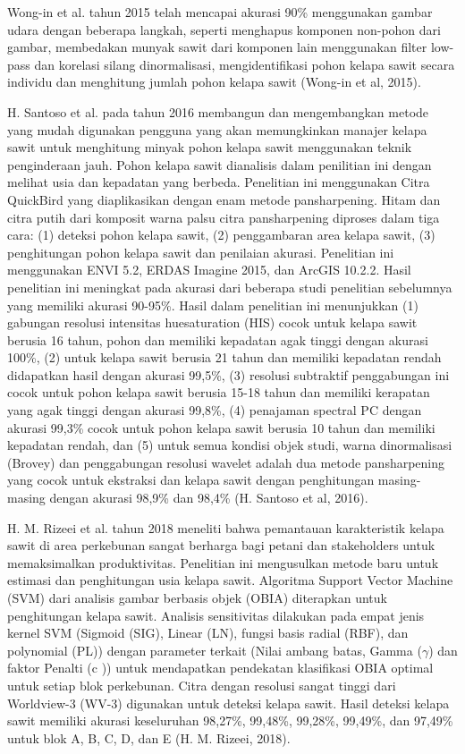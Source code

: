 Wong-in et al. tahun 2015 telah mencapai akurasi 90\% menggunakan gambar udara dengan beberapa langkah, seperti menghapus komponen non-pohon dari gambar, membedakan munyak sawit dari komponen lain menggunakan filter low-pass dan korelasi silang dinormalisasi, mengidentifikasi pohon kelapa sawit secara individu dan menghitung jumlah pohon kelapa sawit (Wong-in et al, 2015).

H. Santoso et al. pada tahun 2016 membangun dan mengembangkan metode yang mudah digunakan pengguna yang akan memungkinkan manajer kelapa sawit untuk menghitung minyak pohon kelapa sawit menggunakan teknik penginderaan jauh. Pohon kelapa sawit dianalisis dalam penilitian ini dengan melihat usia dan kepadatan yang berbeda. Penelitian ini menggunakan Citra QuickBird yang diaplikasikan dengan enam metode pansharpening. Hitam dan citra putih dari komposit warna palsu citra pansharpening diproses dalam tiga cara: (1) deteksi pohon kelapa sawit, (2) penggambaran area kelapa sawit, (3) penghitungan pohon kelapa sawit dan penilaian akurasi. Penelitian ini menggunakan ENVI 5.2, ERDAS Imagine 2015, dan ArcGIS 10.2.2. Hasil penelitian ini meningkat pada akurasi dari beberapa studi penelitian sebelumnya yang memiliki akurasi 90-95\%. Hasil dalam penelitian ini menunjukkan (1) gabungan resolusi intensitas huesaturation (HIS) cocok untuk kelapa sawit berusia 16 tahun, pohon dan memiliki kepadatan agak tinggi dengan akurasi 100\%, (2) untuk kelapa sawit berusia 21 tahun dan memiliki kepadatan rendah didapatkan hasil dengan akurasi 99,5\%, (3) resolusi subtraktif penggabungan ini cocok untuk pohon kelapa sawit berusia 15-18 tahun dan memiliki kerapatan yang agak tinggi dengan akurasi 99,8\%, (4) penajaman spectral PC dengan akurasi 99,3\% cocok untuk pohon kelapa sawit berusia 10 tahun dan memiliki kepadatan rendah, dan (5) untuk semua kondisi objek studi, warna dinormalisasi (Brovey) dan penggabungan resolusi wavelet adalah dua metode pansharpening yang cocok untuk ekstraksi dan kelapa sawit dengan penghitungan masing-masing dengan akurasi 98,9\% dan 98,4\% (H. Santoso et al, 2016).

H. M. Rizeei et al. tahun 2018 meneliti bahwa pemantauan karakteristik kelapa sawit di area perkebunan sangat berharga bagi petani dan stakeholders untuk memaksimalkan produktivitas. Penelitian ini mengusulkan metode baru untuk estimasi dan penghitungan usia kelapa sawit. Algoritma Support Vector Machine (SVM) dari analisis gambar berbasis objek (OBIA) diterapkan untuk penghitungan kelapa sawit. Analisis sensitivitas dilakukan pada empat jenis kernel SVM (Sigmoid (SIG), Linear (LN), fungsi basis radial (RBF), dan polynomial (PL)) dengan parameter terkait (Nilai ambang batas, Gamma ($\gamma$) dan faktor Penalti (c )) untuk mendapatkan pendekatan klasifikasi OBIA optimal untuk setiap blok perkebunan. Citra dengan resolusi sangat tinggi dari Worldview-3 (WV-3) digunakan untuk deteksi kelapa sawit. Hasil deteksi kelapa sawit memiliki akurasi keseluruhan 98,27\%, 99,48\%, 99,28\%, 99,49\%, dan 97,49\% untuk blok A, B, C, D, dan E (H. M. Rizeei, 2018).

